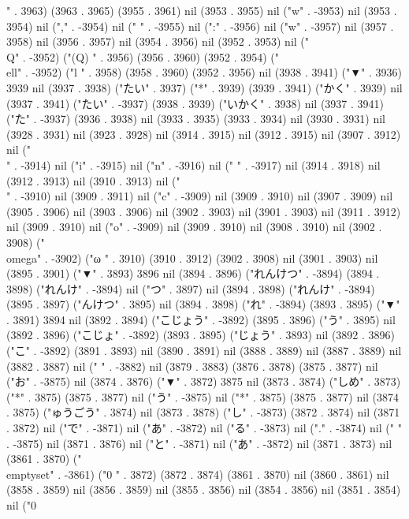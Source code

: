 {" . 3963) (3963 . 3965) (3955 . 3961) nil (3953 . 3955) nil ("w" . -3953) nil (3953 . 3954) nil ("," . -3954) nil (" " . -3955) nil (":" . -3956) nil ("w" . -3957) nil (3957 . 3958) nil (3956 . 3957) nil (3954 . 3956) nil (3952 . 3953) nil ("\\Q" . -3952) ("(Q)
" . 3956) (3956 . 3960) (3952 . 3954) ("\\ell" . -3952) ("l
" . 3958) (3958 . 3960) (3952 . 3956) nil (3938 . 3941) ("▼" . 3936) 3939 nil (3937 . 3938) ("たい" . 3937) ("*" . 3939) (3939 . 3941) ("かく" . 3939) nil (3937 . 3941) ("たい" . -3937) (3938 . 3939) ("いかく" . 3938) nil (3937 . 3941) ("た" . -3937) (3936 . 3938) nil (3933 . 3935) (3933 . 3934) nil (3930 . 3931) nil (3928 . 3931) nil (3923 . 3928) nil (3914 . 3915) nil (3912 . 3915) nil (3907 . 3912) nil ("\\" . -3914) nil ("i" . -3915) nil ("n" . -3916) nil (" " . -3917) nil (3914 . 3918) nil (3912 . 3913) nil (3910 . 3913) nil ("\\" . -3910) nil (3909 . 3911) nil ("c" . -3909) nil (3909 . 3910) nil (3907 . 3909) nil (3905 . 3906) nil (3903 . 3906) nil (3902 . 3903) nil (3901 . 3903) nil (3911 . 3912) nil (3909 . 3910) nil ("o" . -3909) nil (3909 . 3910) nil (3908 . 3910) nil (3902 . 3908) ("\\omega" . -3902) ("ω
" . 3910) (3910 . 3912) (3902 . 3908) nil (3901 . 3903) nil (3895 . 3901) ("▼" . 3893) 3896 nil (3894 . 3896) ("れんけつ" . -3894) (3894 . 3898) ("れんけ" . -3894) nil ("つ" . 3897) nil (3894 . 3898) ("れんけ" . -3894) (3895 . 3897) ("んけつ" . 3895) nil (3894 . 3898) ("れ" . -3894) (3893 . 3895) ("▼" . 3891) 3894 nil (3892 . 3894) ("こじょう" . -3892) (3895 . 3896) ("う" . 3895) nil (3892 . 3896) ("こじょ" . -3892) (3893 . 3895) ("じょう" . 3893) nil (3892 . 3896) ("こ" . -3892) (3891 . 3893) nil (3890 . 3891) nil (3888 . 3889) nil (3887 . 3889) nil (3882 . 3887) nil (" " . -3882) nil (3879 . 3883) (3876 . 3878) (3875 . 3877) nil ("お" . -3875) nil (3874 . 3876) ("▼" . 3872) 3875 nil (3873 . 3874) ("しめ" . 3873) ("*" . 3875) (3875 . 3877) nil ("う" . -3875) nil ("*" . 3875) (3875 . 3877) nil (3874 . 3875) ("ゅうごう" . 3874) nil (3873 . 3878) ("し" . -3873) (3872 . 3874) nil (3871 . 3872) nil ("で" . -3871) nil ("あ" . -3872) nil ("る" . -3873) nil ("." . -3874) nil (" " . -3875) nil (3871 . 3876) nil ("と" . -3871) nil ("あ" . -3872) nil (3871 . 3873) nil (3861 . 3870) ("\\emptyset" . -3861) ("0
" . 3872) (3872 . 3874) (3861 . 3870) nil (3860 . 3861) nil (3858 . 3859) nil (3856 . 3859) nil (3855 . 3856) nil (3854 . 3856) nil (3851 . 3854) nil ("0
}
